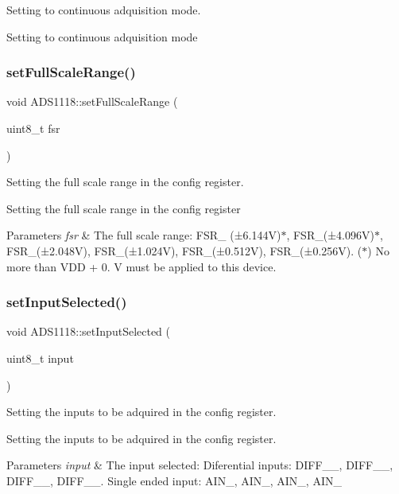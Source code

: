 Setting to continuous adquisition mode. 

Setting to continuous adquisition mode \mbox{\label{class_a_d_s1118_a15fcd99b88c988fef9b4cc04347b08a5}} 
\subsubsection{\texorpdfstring{set\+Full\+Scale\+Range()}{setFullScaleRange()}}
{\footnotesize\ttfamily void A\+D\+S1118\+::set\+Full\+Scale\+Range (\begin{DoxyParamCaption}\item[{uint8\+\_\+t}]{fsr }\end{DoxyParamCaption})}



Setting the full scale range in the config register. 

Setting the full scale range in the config register 
\begin{DoxyParams}{Parameters}
{\em fsr} & The full scale range\+: F\+S\+R\+\_ (±6.144V)$\ast$, F\+S\+R\+\_(±4.096V)$\ast$, F\+S\+R\+\_(±2.048V), F\+S\+R\+\_(±1.024V), F\+S\+R\+\_(±0.512V), F\+S\+R\+\_(±0.256V). ($\ast$) No more than V\+DD + 0. V must be applied to this device. \\
\hline
\end{DoxyParams}
\mbox{\label{class_a_d_s1118_a074c71a9eeb1d0db946f5f4b1308c69f}} 
\subsubsection{\texorpdfstring{set\+Input\+Selected()}{setInputSelected()}}
{\footnotesize\ttfamily void A\+D\+S1118\+::set\+Input\+Selected (\begin{DoxyParamCaption}\item[{uint8\+\_\+t}]{input }\end{DoxyParamCaption})}



Setting the inputs to be adquired in the config register. 

Setting the inputs to be adquired in the config register. 
\begin{DoxyParams}{Parameters}
{\em input} & The input selected\+: Diferential inputs\+: D\+I\+F\+F\+\_\+\_, D\+I\+F\+F\+\_\+\_, D\+I\+F\+F\+\_\+\_, D\+I\+F\+F\+\_\+\_. Single ended input\+: A\+I\+N\+\_, A\+I\+N\+\_, A\+I\+N\+\_, A\+I\+N\+\_ \\
\hline
\end{DoxyParams}
\mbox{\label{class_a_d_s1118_abcabaf741cc3e45e53a6967e0d113073}} 
